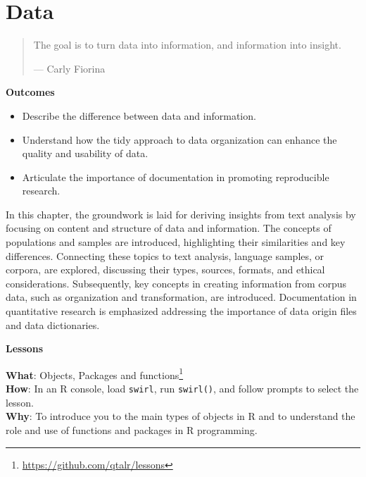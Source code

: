 \documentclass[
  letterpaper,
]{latex/krantz}
\providecommand{\tightlist}{%
  \setlength{\itemsep}{0pt}\setlength{\parskip}{0pt}}\usepackage{longtable,booktabs,array}
\theoremstyle{definition}
\theoremstyle{remark}
\DeclareRobustCommand{\href}[2]{#2\footnote{\url{#1}}}
\begin{document}
\chapter{Data}\label{sec-data-chapter}

\begin{quote}
The goal is to turn data into information, and information into insight.

--- Carly Fiorina
\end{quote}

\begin{tcolorbox}[enhanced jigsaw, colback=white, colframe=quarto-callout-color-frame, leftrule=.75mm, opacityback=0, rightrule=.15mm, bottomrule=.15mm, toprule=.15mm, breakable, left=2mm, arc=.35mm]

\textbf{ Outcomes}

\begin{itemize}
\tightlist
\item
  Describe the difference between data and information.
\item
  Understand how the tidy approach to data organization can enhance the
  quality and usability of data.
\item
  Articulate the importance of documentation in promoting reproducible
  research.
\end{itemize}

\end{tcolorbox}

In this chapter, the groundwork is laid for deriving insights from text
analysis by focusing on content and structure of data and information.
The concepts of populations and samples are introduced, highlighting
their similarities and key differences. Connecting these topics to text
analysis, language samples, or corpora, are explored, discussing their
types, sources, formats, and ethical considerations. Subsequently, key
concepts in creating information from corpus data, such as organization
and transformation, are introduced. Documentation in quantitative
research is emphasized addressing the importance of data origin files
and data dictionaries.

\begin{tcolorbox}[enhanced jigsaw, colback=white, colframe=quarto-callout-color-frame, leftrule=.75mm, opacityback=0, rightrule=.15mm, bottomrule=.15mm, toprule=.15mm, breakable, left=2mm, arc=.35mm]

\textbf{ Lessons}

\textbf{What}: \href{https://github.com/qtalr/lessons}{Objects, Packages
and functions}\\
\textbf{How}: In an R console, load \texttt{swirl}, run
\texttt{swirl()}, and follow prompts to select the lesson.\\
\textbf{Why}: To introduce you to the main types of objects in R and to
understand the role and use of functions and packages in R programming.

\end{tcolorbox}
\end{document}
